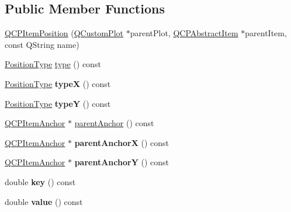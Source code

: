 \subsection*{Public Member Functions}
\begin{DoxyCompactItemize}
\item 
\hyperlink{classQCPItemPosition_a3efc524f37fdcd22907545eb77555ce4}{Q\+C\+P\+Item\+Position} (\hyperlink{classQCustomPlot}{Q\+Custom\+Plot} $\ast$parent\+Plot, \hyperlink{classQCPAbstractItem}{Q\+C\+P\+Abstract\+Item} $\ast$parent\+Item, const Q\+String name)
\item 
\hyperlink{classQCPItemPosition_aad9936c22bf43e3d358552f6e86dbdc8}{Position\+Type} \hyperlink{classQCPItemPosition_aecb709d72c9aa334a7f62e2c9e0b5d60}{type} () const 
\item 
\hypertarget{classQCPItemPosition_a3cb68cf9c95be05c66a0f47448e328e5}{}\hyperlink{classQCPItemPosition_aad9936c22bf43e3d358552f6e86dbdc8}{Position\+Type} {\bfseries type\+X} () const \label{classQCPItemPosition_a3cb68cf9c95be05c66a0f47448e328e5}

\item 
\hypertarget{classQCPItemPosition_a8a2fec9dec1ce006a598b32685fd7ab3}{}\hyperlink{classQCPItemPosition_aad9936c22bf43e3d358552f6e86dbdc8}{Position\+Type} {\bfseries type\+Y} () const \label{classQCPItemPosition_a8a2fec9dec1ce006a598b32685fd7ab3}

\item 
\hyperlink{classQCPItemAnchor}{Q\+C\+P\+Item\+Anchor} $\ast$ \hyperlink{classQCPItemPosition_a7b4ffab9946945c0e11cd2352dc2e042}{parent\+Anchor} () const 
\item 
\hypertarget{classQCPItemPosition_a485abba71c8552086c5f68e95dca7f9a}{}\hyperlink{classQCPItemAnchor}{Q\+C\+P\+Item\+Anchor} $\ast$ {\bfseries parent\+Anchor\+X} () const \label{classQCPItemPosition_a485abba71c8552086c5f68e95dca7f9a}

\item 
\hypertarget{classQCPItemPosition_a1502dba801cb20424b7e097399e372de}{}\hyperlink{classQCPItemAnchor}{Q\+C\+P\+Item\+Anchor} $\ast$ {\bfseries parent\+Anchor\+Y} () const \label{classQCPItemPosition_a1502dba801cb20424b7e097399e372de}

\item 
\hypertarget{classQCPItemPosition_ac3cb2bddf5f89e5181830be30b93d090}{}double {\bfseries key} () const \label{classQCPItemPosition_ac3cb2bddf5f89e5181830be30b93d090}

\item 
\hypertarget{classQCPItemPosition_a6817f7356d3a2b63e8446c6b6106dae1}{}double {\bfseries value} () const \label{classQCPItemPosition_a6817f7356d3a2b63e8446c6b6106dae1}


\end{DoxyCompactItemize}
